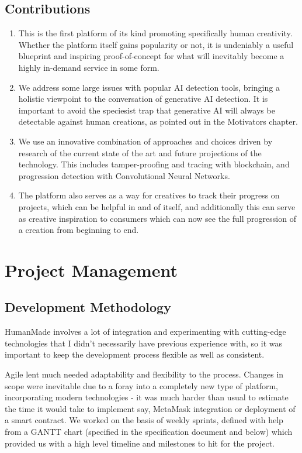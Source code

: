 \documentclass[12pt,a4paper]{article}
\begin{document}
\subsection{Contributions}
\begin{enumerate}
    \item This is the first platform of its kind promoting specifically human creativity. Whether the platform itself gains popularity or not, it is undeniably a useful blueprint and inspiring proof-of-concept for what will inevitably become a highly in-demand service in some form.
    \item We address some large issues with popular AI detection tools, bringing a holistic viewpoint to the conversation of generative AI detection. It is important to avoid the speciesist trap that generative AI will always be detectable against human creations, as pointed out in the Motivators chapter.
    \item We use an innovative combination of approaches and choices driven by research of the current state of the art and future projections of the technology. This includes tamper-proofing and tracing with blockchain, and progression detection with Convolutional Neural Networks.
    \item The platform also serves as a way for creatives to track their progress on projects, which can be helpful in and of itself, and additionally this can serve as creative inspiration to consumers which can now see the full progression of a creation from beginning to end.
\end{enumerate}
\section{Project Management}
\subsection{Development Methodology}
HumanMade involves a lot of integration and experimenting with cutting-edge technologies that I didn't necessarily have previous experience with, so it was important to keep the development process flexible as well as consistent.

Agile lent much needed adaptability and flexibility to the process. Changes in scope were inevitable due to a foray into a completely new type of platform, incorporating modern technologies - it was much harder than usual to estimate the time it would take to implement say, MetaMask integration or deployment of a smart contract. We worked on the basis of weekly sprints, defined with help from a GANTT chart (specified in the specification document and below) which provided us with a high level timeline and milestones to hit for the project.
\end{document}
